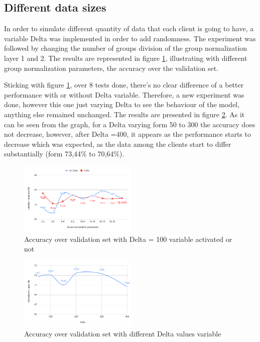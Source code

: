 \documentclass[twocolumn]{article}
\begin{document}
\subsection{Different data sizes}
In order to simulate different quantity of data that each client is going to have, a variable Delta was implemented in order to add randomness. The experiment was followed by changing the number of groups division of the group normalization layer 1 and 2. The results are represented in figure \ref{AccDiff}, illustrating with different group normalization parameters, the accuracy over the validation set. 

Sticking with figure \ref{AccDiff}, over 8 tests done, there's no clear difference of a better performance with or without Delta variable. Therefore, a new experiment was done, however this one just varying Delta to see the behaviour of the model, anything else remained unchanged. The results are presented in figure \ref{DeltaValue}. As it can be seen from the graph, for a Delta varying form 50 to 300 the accuracy does not decrease, however, after Delta =400, it appears as the performance starts to decrease which was expected, as the data among the clients start to differ substantially (form 73,44\% to 70,64\%).


\begin{figure}
    \centering
    \includegraphics[width=0.5\textwidth,height=.3\textheight]{groupnormalizationDeltaNoDelta.png}
    \caption{Accuracy over validation set with Delta = 100 variable activated or not}
     \label{AccDiff} 
\end{figure}

\begin{figure}
    \centering
    \includegraphics[width=0.5\textwidth,height=.3\textheight]{deltacomparison.png}
    \caption{Accuracy over validation set with different Delta values variable}
     \label{DeltaValue} 
\end{figure}
\end{document}
